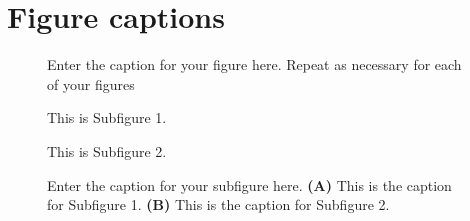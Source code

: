 \documentclass[utf8]{FrontiersinVancouver} %
\begin{document}
% 





\section*{Figure captions}



\begin{figure}[h!]
\begin{center}
\end{center}
\caption{ Enter the caption for your figure here.  Repeat as  necessary for each of your figures}\label{fig:1}
\end{figure}

\setcounter{figure}{2}
\setcounter{subfigure}{0}
\begin{subfigure}
\setcounter{figure}{2}
\setcounter{subfigure}{0}
    \centering
    \begin{minipage}[b]{0.5\textwidth}
        \caption{This is Subfigure 1.}
        \label{fig:Subfigure 1}
    \end{minipage}  
   
\setcounter{figure}{2}
\setcounter{subfigure}{1}
    \begin{minipage}[b]{0.5\textwidth}
        \caption{This is Subfigure 2.}
        \label{fig:Subfigure 2}
    \end{minipage}

\setcounter{figure}{2}
\setcounter{subfigure}{-1}
    \caption{Enter the caption for your subfigure here. \textbf{(A)} This is the caption for Subfigure 1. \textbf{(B)} This is the caption for Subfigure 2.}
    \label{fig: subfigures}
\end{subfigure}
\end{document}
